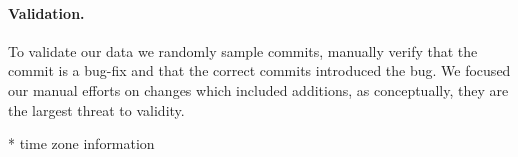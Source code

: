 \paragraph{Validation.}
To validate our data we randomly sample commits, manually verify that
the commit is a bug-fix and that the correct commits introduced the
bug. We focused our manual efforts on changes which included
additions, as conceptually, they are the largest threat to validity.

* time zone information
